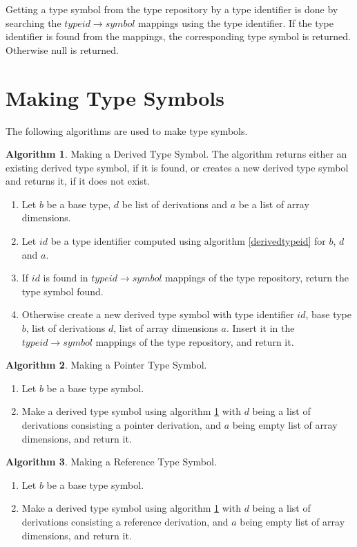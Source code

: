 \documentclass[a4paper,oneside,11pt]{book}
\theoremstyle{definition}
\newtheorem{algo}{Algorithm}[section]
\begin{document}
Getting a type symbol from the type repository by a type identifier is done by searching the $typeid \rightarrow symbol$ mappings using the type identifier.
If the type identifier is found from the mappings, the corresponding type symbol is returned. Otherwise null is returned.

\section{Making Type Symbols}

The following algorithms are used to make type symbols.

\begin{algo}\label{makederivedtype} Making a Derived Type Symbol.
The algorithm returns either an existing derived type symbol, if it is found,
or creates a new derived type symbol and returns it, if it does not exist.
\begin{enumerate}
\item
Let $b$ be a base type, $d$ be list of derivations and $a$ be a list of array dimensions.
\item
Let $id$ be a type identifier computed using algorithm \ref{derivedtypeid} for $b$, $d$ and $a$.
\item
If $id$ is found in $type id \rightarrow symbol$ mappings of the type repository, return the type symbol found.
\item
Otherwise create a new derived type symbol with type identifier $id$, base type $b$, list of derivations $d$, list of array dimensions $a$.
Insert it in the $type id \rightarrow symbol$ mappings of the type repository, and return it.
\end{enumerate}
\end{algo}

\begin{algo}\label{makepointertype} Making a Pointer Type Symbol.
\begin{enumerate}
\item
Let $b$ be a base type symbol.
\item
Make a derived type symbol using algorithm \ref{makederivedtype} with $d$ being a list of derivations consisting a pointer derivation,
and $a$ being empty list of array dimensions, and return it.
\end{enumerate}
\end{algo}

\begin{algo}\label{makereferencetype} Making a Reference Type Symbol.
\begin{enumerate}
\item
Let $b$ be a base type symbol.
\item
Make a derived type symbol using algorithm \ref{makederivedtype} with $d$ being a list of derivations consisting a reference derivation,
and $a$ being empty list of array dimensions, and return it.
\end{enumerate}
\end{algo}
\end{document}

